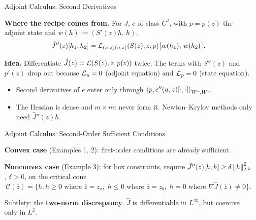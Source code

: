 \documentclass[main.tex]{subfiles}
\begin{document}
\begin{frame}{Adjoint Calculus: Second Derivatives}
  \begin{hlbox}
    \textbf{Where the recipe comes from.} For $J$, $e$ of class $C^2$, with $p = p(z)$ the adjoint state and $w(h) := (S'(z)h,\, h)$,
    \[
      \hat J''(z)[h_1,h_2] = \mathcal{L}_{(u,z)(u,z)}(S(z),z,p)\big[w(h_1),\, w(h_2)\big] .
    \]
  \end{hlbox}

  \begin{hlbox}
    \textbf{Idea.} Differentiate $\hat J(z) = \mathcal{L}(S(z),z,p(z))$ twice. The terms with $S''(z)$ and $p'(z)$ drop out because $\mathcal{L}_u = 0$ (adjoint equation) and $\mathcal{L}_p = 0$ (state equation).
  \end{hlbox}

  \begin{hlbox}
    \begin{itemize}
      \item Second derivatives of $e$ enter only through $\left\langle p, e''(u,z)[\cdot,\cdot] \right\rangle_{W^*,W}$.
      \item The Hessian is dense and $m \times m$: never form it. Newton--Krylov methods only need $\hat J''(z)h$.
    \end{itemize}
  \end{hlbox}
  \vfill\hfill\hyperlink{hessian<3>}{}
\end{frame}

\begin{frame}{Adjoint Calculus: Second-Order Sufficient Conditions}
  \begin{hlbox}
    \textbf{Convex case} (Examples 1, 2): first-order conditions are already sufficient.
  \end{hlbox}

  \begin{hlbox}
    \textbf{Nonconvex case} (Example 3): for box constraints, require $\hat J''(\bar z)[h,h] \ge \delta\left\lVert h \right\rVert_{L^2}^2$, $\delta > 0$, on the critical cone
    \[
      \mathcal{C}(\bar z) = \{ h : h \ge 0 \text{ where } \bar z = z_a,\; h \le 0 \text{ where } \bar z = z_b,\; h = 0 \text{ where } \nabla\hat J(\bar z) \ne 0 \}.
    \]
  \end{hlbox}

  \begin{qbox}
    Subtlety: the \textbf{two-norm discrepancy}. $\hat J$ is differentiable in $L^\infty$, but coercive only in $L^2$.
  \end{qbox}
  \vfill\hfill\hyperlink{hessian<3>}{}
\end{frame}
\end{document}
